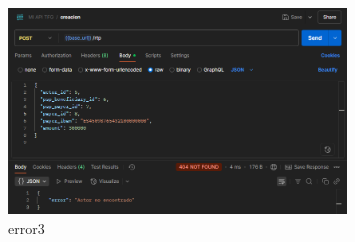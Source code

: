     \begin{figure}[H]
    \centering
    \includegraphics[width=0.8\textwidth]{Imagenes/error3.png}
    \caption{error3}
    \label{fig:error3}
    \end{figure}
